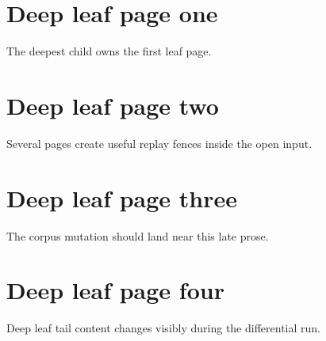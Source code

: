 \section*{Deep leaf page one}
The deepest child owns the first leaf page.

\newpage
\section*{Deep leaf page two}
Several pages create useful replay fences inside the open input.

\newpage
\section*{Deep leaf page three}
The corpus mutation should land near this late prose.

\newpage
\section*{Deep leaf page four}
Deep leaf tail content changes visibly during the differential run.
